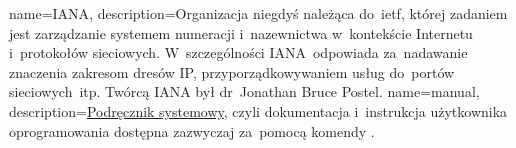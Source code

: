 {
	name={IANA},
	description={Organizacja niegdyś należąca do~\gls{ietf}, której zadaniem jest zarządzanie systemem numeracji i~nazewnictwa w~kontekście Internetu i~protokołów sieciowych. W~szczególności IANA~odpowiada za~nadawanie znaczenia zakresom dresów IP, przyporządkowywaniem usług do~portów sieciowych~itp. Twórcą IANA był dr~Jonathan Bruce Postel.}
}
{
	name={manual},
	description={\href{https://en.wikipedia.org/wiki/User_guide}{Podręcznik systemowy}, czyli dokumentacja i~instrukcja użytkownika oprogramowania dostępna zazwyczaj za~pomocą komendy .}
}

